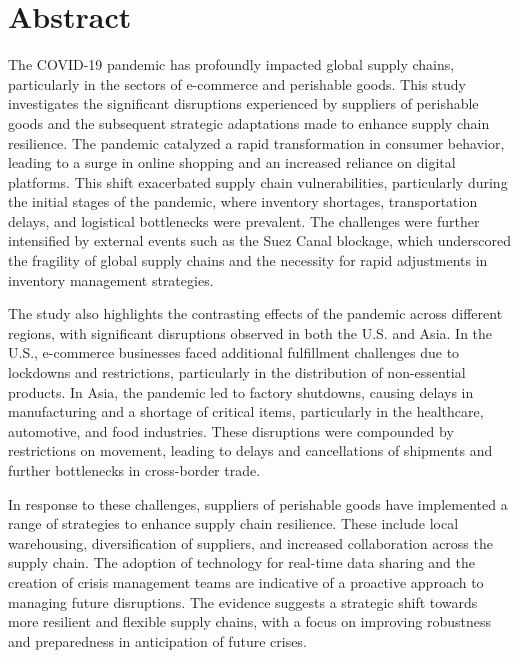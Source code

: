 \thispagestyle{plain}			%
\section*{Abstract}

The COVID-19 pandemic has profoundly impacted global supply chains, particularly in the sectors of e-commerce and perishable goods. This study investigates the significant disruptions experienced by suppliers of perishable goods and the subsequent strategic adaptations made to enhance supply chain resilience. The pandemic catalyzed a rapid transformation in consumer behavior, leading to a surge in online shopping and an increased reliance on digital platforms. This shift exacerbated supply chain vulnerabilities, particularly during the initial stages of the pandemic, where inventory shortages, transportation delays, and logistical bottlenecks were prevalent. The challenges were further intensified by external events such as the Suez Canal blockage, which underscored the fragility of global supply chains and the necessity for rapid adjustments in inventory management strategies.

The study also highlights the contrasting effects of the pandemic across different regions, with significant disruptions observed in both the U.S. and Asia. In the U.S., e-commerce businesses faced additional fulfillment challenges due to lockdowns and restrictions, particularly in the distribution of non-essential products. In Asia, the pandemic led to factory shutdowns, causing delays in manufacturing and a shortage of critical items, particularly in the healthcare, automotive, and food industries. These disruptions were compounded by restrictions on movement, leading to delays and cancellations of shipments and further bottlenecks in cross-border trade.

In response to these challenges, suppliers of perishable goods have implemented a range of strategies to enhance supply chain resilience. These include local warehousing, diversification of suppliers, and increased collaboration across the supply chain. The adoption of technology for real-time data sharing and the creation of crisis management teams are indicative of a proactive approach to managing future disruptions. The evidence suggests a strategic shift towards more resilient and flexible supply chains, with a focus on improving robustness and preparedness in anticipation of future crises.

